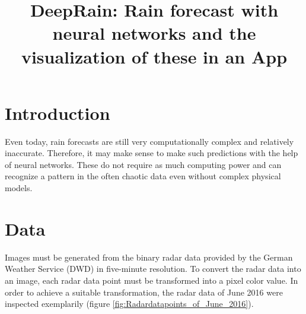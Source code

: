 \documentclass[oneside]{htwg-report}
\begin{document}



\newcommand{\verfasserA}{Simon Christofzik}
\newcommand{\verfasserB}{Paul Sutter}
\newcommand{\verfasserC}{Till Reitlinger}
\newcommand{\thema}{DeepRain: Rain forecast with neural networks and the visualization of these in an App}
\newcommand{\hoschschule}{HTWG Konstanz - University of Applied Sciences}
\newcommand{\institut}{HTWG Konstanz - Institute for Optical Systems}
\newcommand{\prueferA}{Prof. Dr. Oliver Dürr}


\title[Teamprojektthema]{\thema}


\makecover[]


\twocolumn
\section*{Introduction}
    \begin{sloppypar}
        Even today, rain forecasts are still very computationally complex and relatively inaccurate. 
        Therefore, it may make sense to make such predictions with the help of neural networks. 
        These do not require as much computing power and can recognize a pattern in the often chaotic data even without complex physical models.
    \end{sloppypar}

\section*{Data}\label{data}
Images must be generated from the binary radar data provided by the German Weather Service (DWD) in five-minute resolution.
To convert the radar data into an image, each radar data point must be transformed into a pixel color value.
In order to achieve a suitable transformation, the radar data of June 2016 were inspected exemplarily (figure \ref{fig:Radardatapoints_of_June_2016}). 
\end{document}
